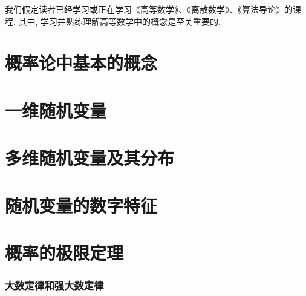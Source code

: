 
\usepackage{ctex}
\usepackage{pifont}
\usepackage{cleveref}
\usepackage{pstricks}
\usepackage{pgfplots}





我们假定读者已经学习或正在学习《高等数学》、《离散数学》、《算法导论》的课程. 其中, 学习并熟练理解高等数学中的概念是至关重要的. 

\part{概率论中基本的概念}


\begin{shaded}
    
\end{shaded}


\begin{shaded}
    
\end{shaded}

\part{一维随机变量}





\part{多维随机变量及其分布}





\part{随机变量的数字特征}








\part{概率的极限定理}



\section{大数定律和强大数定律}

